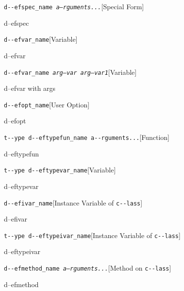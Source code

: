 \documentclass{book}
\begin{document}
\begin{titlepage}
\noindent\texttt{d{-}{-}efspec\_name \EmbracOn{}\textnormal{\textsl{a--rguments...}}\EmbracOff{}}\hfill[Special Form]



%
d--efspec

\noindent\texttt{d{-}{-}efvar\_name}\hfill[Variable]



%
d--efvar

\noindent\texttt{d{-}{-}efvar\_name \EmbracOn{}\textnormal{\textsl{arg--var arg--var1}}\EmbracOff{}}\hfill[Variable]



%
d--efvar with args

\noindent\texttt{d{-}{-}efopt\_name}\hfill[User Option]



%
d--efopt

\noindent\texttt{t{-}{-}ype d{-}{-}eftypefun\_name a{-}{-}rguments...}\hfill[Function]



%
d--eftypefun

\noindent\texttt{t{-}{-}ype d{-}{-}eftypevar\_name}\hfill[Variable]



%
d--eftypevar

\noindent\texttt{d{-}{-}efivar\_name}\hfill[Instance Variable of \texttt{c{-}{-}lass}]



%
d--efivar

\noindent\texttt{t{-}{-}ype d{-}{-}eftypeivar\_name}\hfill[Instance Variable of \texttt{c{-}{-}lass}]



%
d--eftypeivar

\noindent\texttt{d{-}{-}efmethod\_name \EmbracOn{}\textnormal{\textsl{a--rguments...}}\EmbracOff{}}\hfill[Method on \texttt{c{-}{-}lass}]



%
d--efmethod


\end{titlepage}
\end{document}
